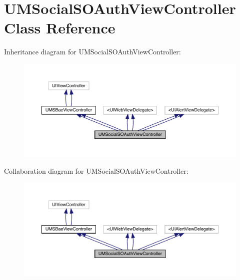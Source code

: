 \hypertarget{interface_u_m_social_s_o_auth_view_controller}{}\section{U\+M\+Social\+S\+O\+Auth\+View\+Controller Class Reference}
\label{interface_u_m_social_s_o_auth_view_controller}


Inheritance diagram for U\+M\+Social\+S\+O\+Auth\+View\+Controller\+:\nopagebreak
\begin{figure}[H]
\begin{center}
\leavevmode
\includegraphics[width=350pt]{interface_u_m_social_s_o_auth_view_controller__inherit__graph}
\end{center}
\end{figure}


Collaboration diagram for U\+M\+Social\+S\+O\+Auth\+View\+Controller\+:\nopagebreak
\begin{figure}[H]
\begin{center}
\leavevmode
\includegraphics[width=350pt]{interface_u_m_social_s_o_auth_view_controller__coll__graph}
\end{center}
\end{figure}
